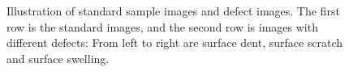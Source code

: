 \begin{figure}[h]
{\begin{minipage}[b]{0.2\textwidth}
\end{minipage}
}
\caption{Illustration of standard sample images and defect images. The first row is the standard images, and the second row is images with different defects: From left to right are surface dent, surface scratch and surface swelling.}
\label{fig:sample}
\end{figure}

